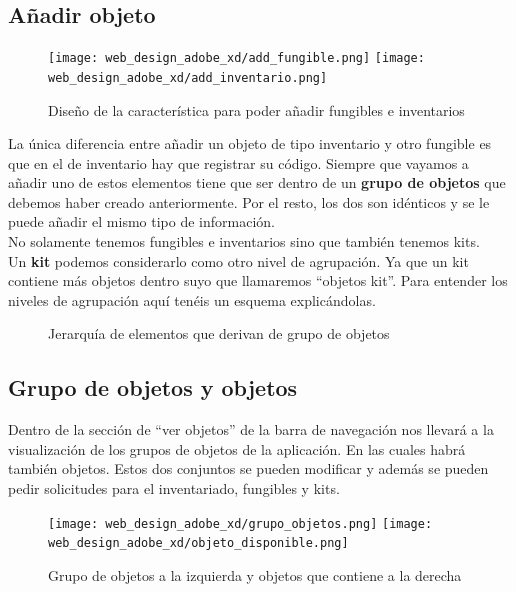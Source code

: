 \subsection{Añadir objeto}

\begin{figure}[H]
    \begin{center}
        \texttt{[image: web\_design\_adobe\_xd/add\_fungible.png]}
        \texttt{[image: web\_design\_adobe\_xd/add\_inventario.png]}
        \caption{Diseño de la característica para poder añadir fungibles e inventarios}
    \end{center}
\end{figure}

La única diferencia entre añadir un objeto de tipo inventario y otro fungible es que en el de inventario hay que registrar su código. Siempre que vayamos a añadir uno de estos elementos tiene que ser dentro de un \textbf{grupo de objetos} que debemos haber creado anteriormente. Por el resto, los dos son idénticos y se le puede añadir el mismo tipo de información.
\\No solamente tenemos fungibles e inventarios sino que también tenemos kits.
\\Un \textbf{kit} podemos considerarlo como otro nivel de agrupación. Ya que un kit contiene más objetos dentro suyo que llamaremos ``objetos kit''. Para entender los niveles de agrupación aquí tenéis un esquema explicándolas.

\begin{figure}[H]
    \caption{Jerarquía de elementos que derivan de grupo de objetos}
\end{figure}

\subsection{Grupo de objetos y objetos}

Dentro de la sección de ``ver objetos'' de la barra de navegación nos llevará a la visualización de los grupos de objetos de la aplicación. En las cuales habrá también objetos. Estos dos conjuntos se pueden modificar y además se pueden pedir solicitudes para el inventariado, fungibles y kits.

\begin{figure}[htbp]
    \centering
    \texttt{[image: web\_design\_adobe\_xd/grupo\_objetos.png]}
    \texttt{[image: web\_design\_adobe\_xd/objeto\_disponible.png]}
    \caption{Grupo de objetos a la izquierda y objetos que contiene a la derecha}
\end{figure}

